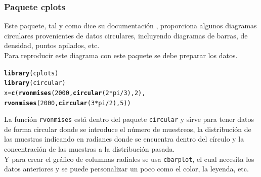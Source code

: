 \documentclass{article}\usepackage[]{graphicx}\usepackage[]{color}
\makeatletter
\newcommand{\hlnum}[1]{\textcolor[rgb]{0.686,0.059,0.569}{#1}}%
\newcommand{\hlopt}[1]{\textcolor[rgb]{0,0,0}{#1}}%
\newcommand{\hlstd}[1]{\textcolor[rgb]{0.345,0.345,0.345}{#1}}%
\newcommand{\hlkwb}[1]{\textcolor[rgb]{0.69,0.353,0.396}{#1}}%
\newcommand{\hlkwd}[1]{\textcolor[rgb]{0.737,0.353,0.396}{\textbf{#1}}}%
\newenvironment{kframe}{%
 \def\at@end@of@kframe{}%
 \ifinner\ifhmode%
  \def\at@end@of@kframe{\end{minipage}}%
  \begin{minipage}{\columnwidth}%
 \fi\fi%
 \def\FrameCommand##1{\hskip\@totalleftmargin \hskip-\fboxsep
 \colorbox{shadecolor}{##1}\hskip-\fboxsep
     \hskip-\linewidth \hskip-\@totalleftmargin \hskip\columnwidth}%
 \MakeFramed {\advance\hsize-\width
   \@totalleftmargin\z@ \linewidth\hsize
   \@setminipage}}%
 {\par\unskip\endMakeFramed%
 \at@end@of@kframe}
\newenvironment{knitrout}{}{} %
\makeatother
\begin{document}
\subsubsection{Paquete cplots}
Este paquete, tal y como dice su documentaci\'on \cite{docu_cplot}
, proporciona algunos diagramas circulares provenientes de datos circulares, incluyendo diagramas de barras, de densidad, puntos apilados, etc.~\\
Para reproducir este diagrama con este paquete se debe preparar los datos.
\begin{knitrout}
\color{fgcolor}\begin{kframe}
\begin{alltt}
\hlkwd{library}\hlstd{(cplots)}
\hlkwd{library}\hlstd{(circular)}
\hlstd{x} \hlkwb{=} \hlkwd{c}\hlstd{(}\hlkwd{rvonmises}\hlstd{(}\hlnum{2000}\hlstd{,} \hlkwd{circular}\hlstd{(}\hlnum{2}\hlopt{*}\hlstd{pi}\hlopt{/}\hlnum{3}\hlstd{),} \hlnum{2}\hlstd{),}
      \hlkwd{rvonmises}\hlstd{(}\hlnum{2000}\hlstd{,} \hlkwd{circular}\hlstd{(}\hlnum{3}\hlopt{*}\hlstd{pi}\hlopt{/}\hlnum{2}\hlstd{),} \hlnum{5}\hlstd{))}
\end{alltt}
\end{kframe}
\end{knitrout}
La funci\'on \texttt{rvonmises} est\'a dentro del paquete \texttt{circular} y sirve para tener datos de forma circular donde se introduce el n\'umero de muestreos, la distribuci\'on de las muestras indicando en radianes donde se encuentra dentro del c\'irculo y la concentraci\'on de las muestras a la distribuci\'on pasada.~\\
Y para crear el gr\'afico de columnas radiales se usa \texttt{cbarplot}, el cual necesita los datos anteriores y se puede personalizar un poco como el color, la leyenda, etc.
\end{document}
